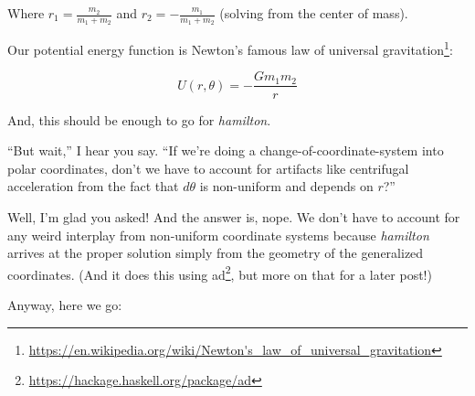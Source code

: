 \documentclass[]{article}
\renewcommand{\href}[2]{#2\footnote{\url{#1}}}
\begin{document}
Where \(r_1 = \frac{m_2}{m_1 + m_2}\) and \(r_2 = - \frac{m_1}{m_1 + m_2}\)
(solving from the center of mass).

Our potential energy function is Newton's famous
\href{https://en.wikipedia.org/wiki/Newton's_law_of_universal_gravitation}{law
of universal gravitation}:

\[
U(r, \theta) = - \frac{G m_1 m_2}{r}
\]

And, this should be enough to go for \emph{hamilton}.

``But wait,'' I hear you say. ``If we're doing a change-of-coordinate-system
into polar coordinates, don't we have to account for artifacts like centrifugal
acceleration from the fact that \(d \theta\) is non-uniform and depends on
\(r\)?''

Well, I'm glad you asked! And the answer is, nope. We don't have to account for
any weird interplay from non-uniform coordinate systems because \emph{hamilton}
arrives at the proper solution simply from the geometry of the generalized
coordinates. (And it does this using
\href{https://hackage.haskell.org/package/ad}{ad}, but more on that for a later
post!)

Anyway, here we go:
\end{document}
